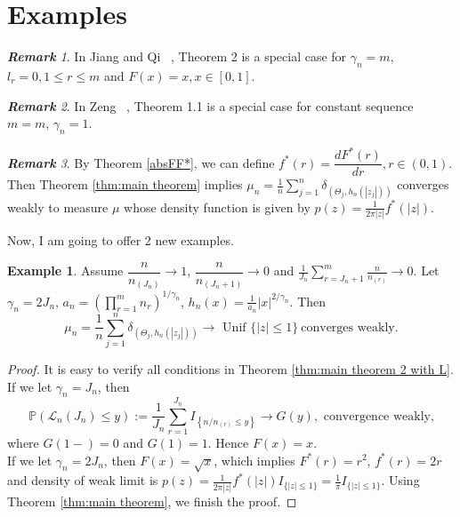 \documentclass[12pt]{article}
\theoremstyle{plain}
\theoremstyle{definition}
\newtheorem{exm}{\textbf{Example}}
\theoremstyle{remark}
\newtheorem{rem}{\textbf{Remark}}
\begin{document}
\section{Examples}
\begin{rem}
    In Jiang and Qi ~\cite{JiangQi2019}, Theorem 2 is a special case for $\gamma_n=m$, $l_r=0, 1\leq r\leq m$ and $F(x)=x, x\in [0,1]$.
\end{rem}
\begin{rem}
    In Zeng ~\cite{zeng2017}, Theorem 1.1 is a special case for constant sequence $m=m$,  $\gamma_{n}=1$.
 \end{rem}
 \begin{rem}
By Theorem \ref{absFF*}, we can define $f^*(r)=\dfrac{d F^*(r)}{dr}, r\in (0,1)$. Then Theorem \ref{thm:main theorem} implies $\mu_{n}=\frac{1}{n} \sum_{j=1}^{n} \delta_{\left(\Theta_{j}, h_{n}\left(\left|z_{j}\right|\right)\right)}$ converges weakly to measure $\mu$ whose density function is given by $p(z)=\frac{1}{2 \pi|z|} f^{*}(|z|)$.
\end{rem}
Now, I am going to offer 2 new examples.
\begin{exm}
    Assume $\dfrac{n}{n_{(J_n)}}\rightarrow 1$, $\dfrac{n}{n_{(J_n+1)}}\rightarrow 0$ and $\frac{1}{J_{n}} \sum_{r=J_{n}+1}^{m} \frac{n}{n_{(r)}} \rightarrow 0$. Let $\gamma_{n}=2J_n$, $a_{n}=\left(\prod_{r=1}^{m}n_{r}\right)^{1 / \gamma_{n}}$, $h_{n}(x)=\frac{1}{a_{n}}|x|^{2 / \gamma_{n}}$. Then
    \begin{equation*}
    \mu_{n}=\frac{1}{n} \sum_{j=1}^{n} \delta_{\left(\Theta_{j}, h_{n}\left(\left|z_{j}\right|\right)\right)}\rightarrow \text { Unif }\{|z| \leq 1\}\ \text{converges weakly}.
    \end{equation*}
\end{exm}
\begin{proof}
    It is easy to verify all conditions in Theorem \ref{thm:main theorem 2 with L}. If we let $\gamma_{n}=J_n$, then
    \begin{equation*}
    \mathbb{P}\left(\mathscr{L}_{n}\left(J_{n}\right) \leqslant y\right) :=\frac{1}{J_{n}} \sum_{r=1}^{J_{n}} I_{\left\{n / n_{(r)} \leqslant y\right\}} \rightarrow G(y), \text { convergence weakly,}
    \end{equation*}
    where $G(1-)=0$ and $G(1)=1$. Hence $F(x)=x$. \\
    If we let $\gamma_{n}=2J_n$, then $F(x)=\sqrt x$, which implies $F^*(r)=r^2$, $f^*(r)=2r$ and density of weak limit is $p(z)=\frac{1}{2 \pi|z|} f^{*}(|z|)I_{\{|z|\leq 1\}}=\frac{1}{\pi}I_{\{|z|\leq 1\}}$. Using Theorem \ref{thm:main theorem}, we finish the proof.
\end{proof}
\end{document}
